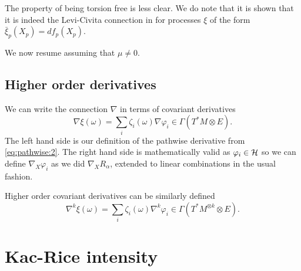 \documentclass{article}
\begin{document}
The property of being torsion free is less clear. We do note that it is shown that it is indeed
the Levi-Civita connection in \cite{RFG,phdthesis} for
processes $\xi$ of the form $\bar{\xi}_p(X_p)=df_p(X_p)$.

We now resume assuming that $\mu \neq 0$.

\subsection{Higher order derivatives}

We can write the connection $\nabla$ in terms of covariant derivatives
$$
{\nabla} \xi(\omega) = \sum_i \zeta_i(\omega) \nabla \varphi_i \in \Gamma(T^*M \otimes E).
$$
The left hand side is our definition of the pathwise derivative from \eqref{eq:pathwise:2}.  The right
hand side is mathematically valid as $\varphi_i \in {\cal H}$ so we can define $\nabla_X \varphi_i$ as we did
$\nabla_XR_{\alpha}$, extended to linear combinations in the usual fashion.

Higher order covariant derivatives can be similarly defined
$$
\nabla^k \xi(\omega) = \sum_i \zeta_i(\omega) \nabla^k \varphi_i \in \Gamma(T^*M^{\otimes k} \otimes E).
$$

\section{Kac-Rice intensity}

\newcommand{\coordchart}{\mathfrak{t}}
\end{document}

